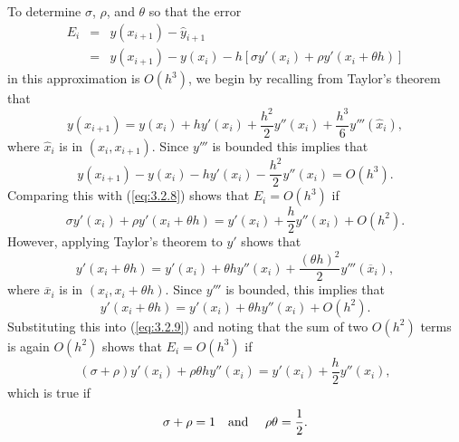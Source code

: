 To determine $\sigma$, $\rho$, and $\theta$ so that the error
\begin{equation}
  \label{eq:3.2.8}
  \begin{array}{rcl}
    E_{i} & = & y(x_{i+1})-\hat{y}_{i+1}                                                   \\
          & = & y(x_{i+1})-y(x_{i})-h\left[\sigma y'(x_{i})+\rho y'(x_{i}+\theta h)\right]
  \end{array}
\end{equation}
in this approximation is $O(h^{3})$, we begin by recalling from Taylor's theorem that
\[
  y(x_{i+1})=y(x_{i})+hy'(x_{i})+\frac{h^{2}}{2}y''(x_{i})+\frac{h^{3}}{6}y'''(\hat{x}_{i}),
\]
where $\hat{x}_{i}$ is in $(x_{i},x_{i+1})$. Since $y'''$ is bounded this implies that
\[
  y(x_{i+1})-y(x_{i})-hy'(x_{i})-\frac{h^{2}}{2}y''(x_{i})=O(h^{3}).
\]
Comparing this with (\ref{eq:3.2.8}) shows that $E_{i}=O(h^{3})$ if
\begin{equation}
  \label{eq:3.2.9}\sigma y'(x_{i})+\rho y'(x_{i}+\theta h)=y'(x_{i})+\frac{h}{2}y''(x_{i}) +O(h^{2}).
\end{equation}
However, applying Taylor's theorem to $y'$ shows that
\[
  y'(x_{i}+\theta h)=y'(x_{i})+\theta hy''(x_{i})+\frac{(\theta h)^{2}}{2}y'''(\overline{x}_{i}),
\]
where $\overline{x}_{i}$ is in $(x_{i},x_{i}+\theta h)$. Since $y'''$ is bounded, this implies that
\[
  y'(x_{i}+\theta h)=y'(x_{i})+\theta hy''(x_{i})+O(h^{2}).
\]
Substituting this into (\ref{eq:3.2.9}) and noting that the sum of two $O(h^{2})$ terms is again
$O(h^{2})$ shows that $E_{i}=O(h^{3})$ if
\[
  (\sigma+\rho)y'(x_{i})+\rho\theta hy''(x_{i})= y'(x_{i})+\frac{h}{2}y''(x_{i}),
\]
which is true if
\begin{equation}
  \label{eq:3.2.10}\sigma+\rho=1\mbox{\quad and \quad}\rho\theta=\frac{1}{2}.
\end{equation}

